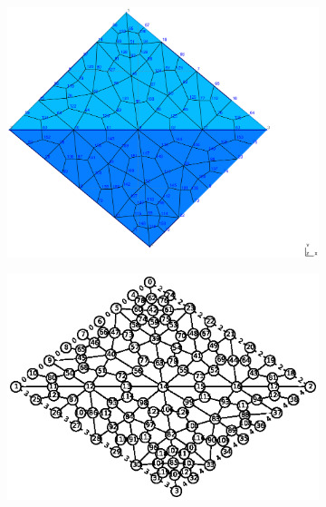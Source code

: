 \documentclass[10pt, a4paper]{article}
\begin{document}
\begin{figure}[H]
\centering
	\begin{subfigure}[H]{0.3\textwidth}
		\includegraphics[width=1.2\textwidth]{fig/test2_1.eps}
		\caption{}
		\label{fig:1}
	\end{subfigure}
	\begin{subfigure}[H]{0.6\textwidth}
		\includegraphics[width=\textwidth]{fig/test2_2.eps}
		\caption{}
		\label{fig:2}
	\end{subfigure}
	\begin{subfigure}[H]{0.45\textwidth}

\end{subfigure}
\end{figure}
\end{document}
